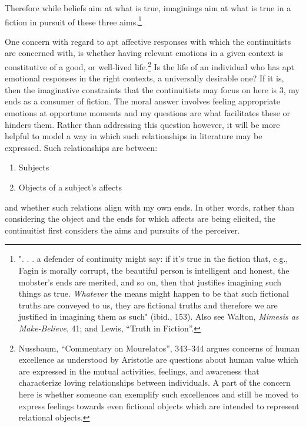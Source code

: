 \documentclass[phdthesis,12pt,final,a4paper]{wuthesis}
\theoremstyle{definition}
\theoremstyle{definition}
\theoremstyle{definition}
\theoremstyle{definition}
\theoremstyle{remark}
\begin{document}
\noindent Therefore while beliefs aim at what is true, imaginings aim at what is true in a fiction in pursuit of these three aims.\footnote{". . . a defender of continuity might say: if it's true in the fiction that, e.g., Fagin is morally corrupt, the beautiful person is intelligent and honest, the mobster's ends are merited, and so on, then that justifies imagining such things as true. \emph{Whatever} the means might happen to be that such fictional truths are conveyed to us, they are fictional truths and therefore we are justified in imagining them as such" (ibid., 153). Also see Walton, \emph{Mimesis as {Make-Believe}}, 41; and Lewis, {``Truth in {Fiction}''}.}

One concern with regard to apt affective responses with which the continuitists are concerned with, is whether having relevant emotions in a given context is constitutive of a good, or well-lived life.\footnote{Nussbaum, {``Commentary on {Mourelatos}''}, 343--344 argues concerns of human excellence as understood by Aristotle are questions about human value which are expressed in the mutual activities, feelings, and awareness that characterize loving relationships between individuals. A part of the concern here is whether someone can exemplify such excellences and still be moved to express feelings towards even fictional objects which are intended to represent relational objects.} Is the life of an individual who has apt emotional responses in the right contexts, a universally desirable one? If it is, then the imaginative constraints that the continuitists may focus on here is 3, my ends as a consumer of fiction. The moral answer involves feeling appropriate emotions at opportune moments and my questions are what facilitates these or hinders them. Rather than addressing this question however, it will be more helpful to model a way in which such relationships in literature may be expressed. Such relationships are between:

\begin{enumerate}
\def\labelenumi{\arabic{enumi}.}
\tightlist
\item
  Subjects
\item
  Objects of a subject's affects
\end{enumerate}

\noindent and whether such relations align with my own ends. In other words, rather than considering the object and the ends for which affects are being elicited, the continuitist first considers the aims and pursuits of the perceiver.
\end{document}
